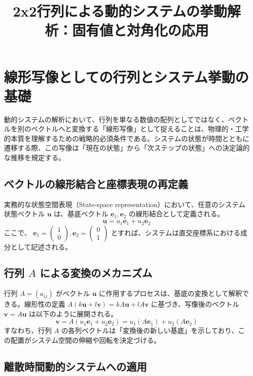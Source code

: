 ﻿\documentclass[12pt]{bxjsarticle}
\title{2x2行列による動的システムの挙動解析：固有値と対角化の応用}
\date{}
\author{}
\begin{document}
\maketitle

\section{線形写像としての行列とシステム挙動の基礎}

動的システムの解析において、行列を単なる数値の配列としてではなく、ベクトルを別のベクトルへと変換する「線形写像」として捉えることは、物理的・工学的本質を理解するための戦略的必須条件である。システムの状態が時間とともに遷移する際、この写像は「現在の状態」から「次ステップの状態」への決定論的な推移を規定する。

\subsection{ベクトルの線形結合と座標表現の再定義}

実務的な状態空間表現（State-space representation）において、任意のシステム状態ベクトル  $\mathbf{u}$  は、基底ベクトル  $\mathbf{e}_1, \mathbf{e}_2$  の線形結合として定義される。  $$\mathbf{u} = u_1\mathbf{e}_1 + u_2\mathbf{e}_2$$  ここで、 $\mathbf{e}_1 = \begin{pmatrix} 1 \\ 0 \end{pmatrix}, \mathbf{e}_2 = \begin{pmatrix} 0 \\ 1 \end{pmatrix}$  とすれば、システムは直交座標系における成分として記述される。

\subsection{行列  $A$  による変換のメカニズム}

行列  $A = (a_{ij})$  がベクトル  $\mathbf{u}$  に作用するプロセスは、基底の変換として解釈できる。線形性の定義  $A(k\mathbf{u} + l\mathbf{v}) = kA\mathbf{u} + lA\mathbf{v}$  に基づき、写像後のベクトル  $\mathbf{v} = A\mathbf{u}$  は以下のように展開される。  $$\mathbf{v} = A(u_1\mathbf{e}_1 + u_2\mathbf{e}_2) = u_1(A\mathbf{e}_1) + u_2(A\mathbf{e}_2)$$  すなわち、行列  $A$  の各列ベクトルは「変換後の新しい基底」を示しており、この配置がシステム空間の伸縮や回転を決定づける。

\subsection{離散時間動的システムへの適用}
\end{document}
